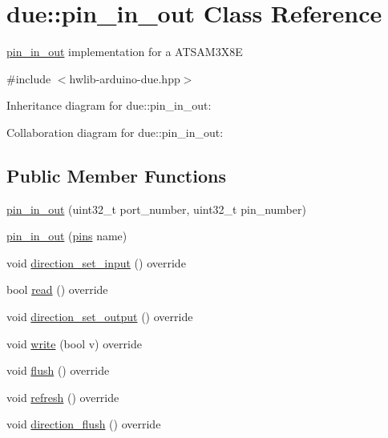 \hypertarget{classdue_1_1pin__in__out}{}\section{due\+:\+:pin\+\_\+in\+\_\+out Class Reference}
\label{classdue_1_1pin__in__out}


\hyperlink{classdue_1_1pin__in__out}{pin\+\_\+in\+\_\+out} implementation for a A\+T\+S\+A\+M3\+X8E  




{\ttfamily \#include $<$hwlib-\/arduino-\/due.\+hpp$>$}



Inheritance diagram for due\+:\+:pin\+\_\+in\+\_\+out\+:


Collaboration diagram for due\+:\+:pin\+\_\+in\+\_\+out\+:
\subsection*{Public Member Functions}
\begin{DoxyCompactItemize}
\item 
\hyperlink{classdue_1_1pin__in__out_a1673814fdfa3f4c152be2b5aa08974cd}{pin\+\_\+in\+\_\+out} (uint32\+\_\+t port\+\_\+number, uint32\+\_\+t pin\+\_\+number)
\item 
\hyperlink{classdue_1_1pin__in__out_a228da28eb609b180235db2a0ed249469}{pin\+\_\+in\+\_\+out} (\hyperlink{namespacedue_a8ffa3ec309934ff9db34317e504bcc92}{pins} name)
\item 
void \hyperlink{classdue_1_1pin__in__out_a2ca0c81a7e1059a171c997d5015d99ea}{direction\+\_\+set\+\_\+input} () override
\item 
bool \hyperlink{classdue_1_1pin__in__out_a864093a15647637d71ecd8ded27ba4f8}{read} () override
\item 
void \hyperlink{classdue_1_1pin__in__out_a45f7cf2e7f71638337f82ecf1852f884}{direction\+\_\+set\+\_\+output} () override
\item 
void \hyperlink{classdue_1_1pin__in__out_aa6782f78c09d67ce8ded0aaf3e4f5c02}{write} (bool v) override
\item 
void \hyperlink{classdue_1_1pin__in__out_af138c21a34306d3421e0b961bf9406a1}{flush} () override
\item 
void \hyperlink{classdue_1_1pin__in__out_ab9fc7183f352e0b19004779803cd5950}{refresh} () override
\item 
void \hyperlink{classdue_1_1pin__in__out_aa56ac6fe5ef886f6c88eb7562ecccfca}{direction\+\_\+flush} () override
\end{DoxyCompactItemize}


